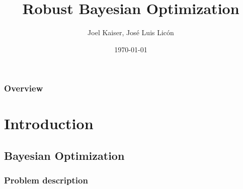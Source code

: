 \documentclass[10pt,handout]{beamer}
\title[RoBO]
{Robust Bayesian Optimization}
\author{Joel Kaiser, José Luis Licón}
\institute[Uni Freiburg] %
{
Albert-Ludwigs-Universität Freiburg \\ %
\medskip
}
\date{\today} %
\begin{document}



\begin{frame}
\titlepage %
\end{frame}

\begin{frame}
\frametitle{Overview} %
\tableofcontents %
\end{frame}


\section{Introduction}


\subsection{Bayesian Optimization}


\begin{frame}
\frametitle{Problem description}
  

% 

\end{frame}

\end{document}
